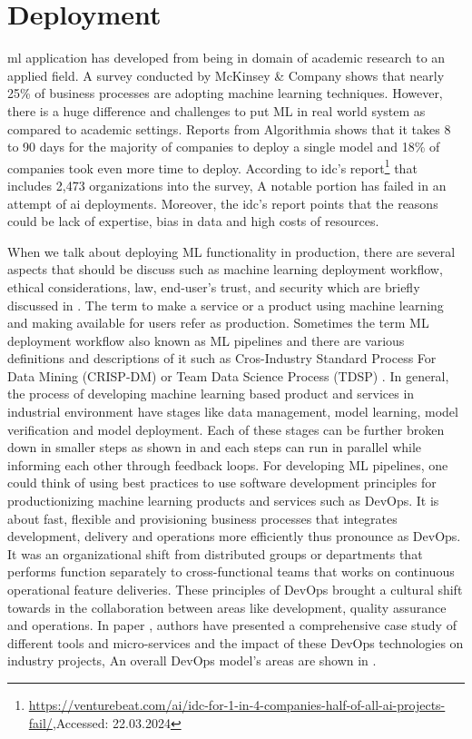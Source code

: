 \section{Deployment \label{deployment_section}}
\acrshort{ml} application has developed from being in domain of academic research to an applied field. A survey conducted by McKinsey \& Company \cite{analytics2019global} shows that nearly 25\% of business processes are adopting machine learning techniques. However, there is a huge difference and challenges to put ML in real world system as compared to academic settings. Reports from Algorithmia \cite{wiggers2019algorithmia, hecht2019add} shows that it takes 8 to 90 days for the majority of companies to deploy a single model and 18\% of companies took even more time to deploy. According to \acrfull{idc}'s report\footnote{\url{https://venturebeat.com/ai/idc-for-1-in-4-companies-half-of-all-ai-projects-fail/},Accessed: 22.03.2024} that includes 2,473 organizations into the survey, A notable portion has failed in an attempt of \acrshort{ai} deployments. Moreover, the \acrshort{idc}'s report points that the reasons could be lack of expertise, bias in data and high costs of resources.

When we talk about deploying ML functionality in production, there are several aspects that should be discuss such as machine learning deployment workflow, ethical considerations, law, end-user's trust, and security which are briefly discussed in \cite{paleyes2022challenges}. The term to make a service or a product using machine learning and making available for users refer as production. Sometimes the term ML deployment workflow also known as ML pipelines and there are various definitions and descriptions of it such as Cros-Industry Standard Process For Data Mining (CRISP-DM) \cite{shearer2000crisp} or Team Data Science Process (TDSP) \cite{TDSP}. In general, the process of developing machine learning based product and services in industrial environment have stages like data management, model learning, model verification and model deployment. Each of these stages can be further broken down in smaller steps as shown in  and each steps can run in parallel while informing each other through feedback loops. For developing ML pipelines, one could think of using best practices to use software development principles for productionizing machine learning products and services such as DevOps. It is about fast, flexible and provisioning business processes that integrates development, delivery and operations more efficiently thus pronounce as DevOps. It was an organizational shift from distributed groups or departments that performs function separately to cross-functional teams that works on continuous operational feature deliveries. These principles of DevOps brought a cultural shift towards in the collaboration between areas like development, quality assurance and operations. In paper \cite{ebert2016devops}, authors have presented a comprehensive case study of different tools and micro-services and the impact of these DevOps technologies on industry projects, An overall DevOps model's areas are shown in . 

